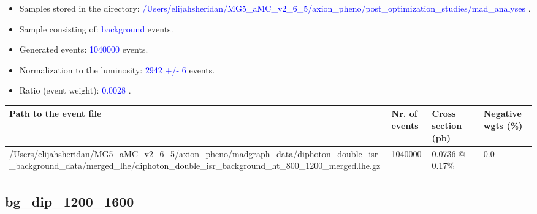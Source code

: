 \documentclass[a4paper, 10pt]{article}
\begin{document}
\begin{itemize}
  \item Samples stored in the directory: \textcolor{blue}{/\-Users/\-elijahsheridan/\-MG5\_aMC\_v2\_6\_5/\-axion\_pheno/\-post\_optimization\_studies/\-mad\_analyses} .
   \item Sample consisting of: \textcolor{blue}{background}  events.
   \item Generated events: \textcolor{blue}{1040000 }  events.
   \item Normalization to the luminosity: \textcolor{blue}{2942}\textcolor{blue}{ +/\-- }\textcolor{blue}{6 }  events.
   \item Ratio (event weight): \textcolor{blue}{0.0028 } .  
 
\end{itemize}
\begin{table}[H]
  \begin{center}
    \begin{tabular}{|m{55.0mm}|m{25.0mm}|m{30.0mm}|m{30.0mm}|}
      \hline
      {\cellcolor{yellow}         Path to the event file}& {\cellcolor{yellow}         Nr. of events}& {\cellcolor{yellow}         Cross section (pb)}& {\cellcolor{yellow}         Negative wgts (\%)}\\
      \hline
      {\cellcolor{white}          /\-Users/\-elijahsheridan/\-MG5\_aMC\_v2\_6\_5/\-axion\_pheno/\-madgraph\_data/\-diphoton\_double\_isr\_background\_data/\-merged\_lhe/\-diphoton\_double\_isr\_background\_ht\_800\_1200\_merged.lhe.gz}& {\cellcolor{white}          1040000}& {\cellcolor{white}          0.0736 @ 0.17\%}& {\cellcolor{white}          0.0}\\
\hline
    \end{tabular}
  \end{center}
\end{table}

\subsection{ bg\_dip\_1200\_1600}
\end{document}
